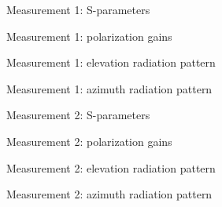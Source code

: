 \documentclass[11pt,a4paper,twoside,openany]{report}
\begin{document}
\newpage
\begin{figure}[!ht]
    \centering
    
    \caption{\label{fig:meas1-sparameters}Measurement 1: S-parameters}
\end{figure}

\begin{figure}[!ht]
    \centering
    
    \caption{\label{fig:meas1-boresight-radiation}Measurement 1: polarization gains}
\end{figure}

\begin{figure}[!ht]
    \centering
    
    \caption{\label{fig:meas1-elevation-radiation}Measurement 1: elevation radiation pattern}
\end{figure}

\begin{figure}[!ht]
    \centering
    
    \caption{\label{fig:meas1-azimuth-radiation}Measurement 1: azimuth radiation pattern}
\end{figure}

\begin{figure}[!ht]
    \centering
    
    \caption{\label{fig:meas2-sparameters}Measurement 2: S-parameters}
\end{figure}

\begin{figure}[!ht]
    \centering
    
    \caption{\label{fig:meas2-boresight-radiation}Measurement 2: polarization gains}
\end{figure}

\begin{figure}[!ht]
    \centering
    
    \caption{\label{fig:meas2-elevation-radiation}Measurement 2: elevation radiation pattern}
\end{figure}

\begin{figure}[!ht]
    \centering
    
    \caption{\label{fig:meas2-azimuth-radiation}Measurement 2: azimuth radiation pattern}
\end{figure}

\printnomenclature

\printbibliography[heading=bibintoc]

\printindex
\end{document}
